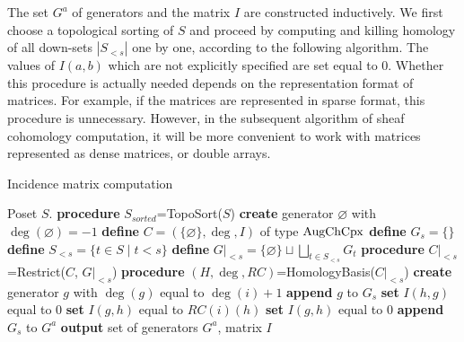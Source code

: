The set $G^a$ of generators and the matrix $I$ are constructed inductively. We first choose a topological sorting of $S$ and proceed by computing and killing homology of all down-sets $|S_{<s}|$ one by one, according to the following algorithm. The values of $I(a,b)$ which are not explicitly specified are set equal to $0$. Whether this procedure is actually needed depends on the representation format of matrices. For example, if the matrices are represented in sparse format, this procedure is unnecessary. However, in the subsequent algorithm of sheaf cohomology computation, it will be more convenient to work with matrices represented as dense matrices, or double arrays.

\begin{algorithm}
    \caption{Incidence matrix computation}\label{algIncMatrixMain}
    \begin{algorithmic}[1]
    \REQUIRE Poset $S$.
    \STATE \textbf{procedure} $S_{sorted}$=TopoSort($S$)
    \STATE \textbf{create} generator $\varnothing$ with $\deg(\varnothing)=-1$
    \STATE \textbf{define} $C=(\{\varnothing\},\deg,I)$ of type $\operatorname{AugChCpx}$
        \STATE \textbf{define} $G_s=\{\}$
        \STATE \textbf{define} $S_{<s}=\{t\in S\mid t<s\}$
        \STATE \textbf{define} $G|_{<s}=\{\varnothing\}\sqcup\bigsqcup_{t\in S_{<s}}G_t$
        \STATE \textbf{procedure} $C|_{<s}$=Restrict($C$, $G|_{<s}$)
        \STATE \textbf{procedure} $(H,\deg,RC)$=HomologyBasis($C|_{<s}$)
            \STATE \textbf{create} generator $g$ with $\deg(g)$ equal to $\deg(i)+1$
            \STATE \textbf{append} $g$ to $G_s$
                \STATE \textbf{set} $I(h,g)$ equal to $0$
                    \STATE \textbf{set} $I(g,h)$ equal to $RC(i)(h)$
                \ELSE
                    \STATE \textbf{set} $I(g,h)$ equal to $0$
                \ENDIF
            \ENDFOR
        \ENDFOR
        \STATE \textbf{append} $G_s$ to $G^a$
    \ENDFOR
    \STATE \textbf{output} set of generators $G^a$, matrix $I$
    \end{algorithmic}
\end{algorithm}


